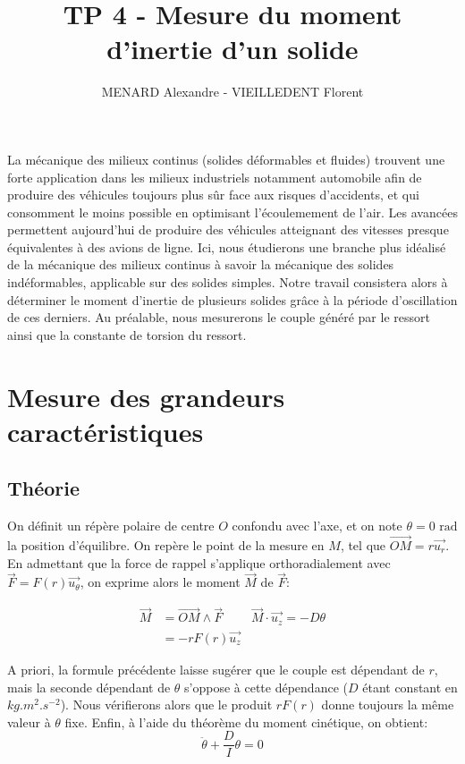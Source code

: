 \documentclass[12pt]{article}
\title{\vspace{-2cm}\textbf{TP 4 - Mesure du moment d'inertie d'un solide}}
\author{\vspace{-0.5cm}MENARD Alexandre - VIEILLEDENT Florent}
\date{\vspace{-0.7cm}}
\newcommand{\ut}{\vec{u_\theta}}
\newcommand{\ur}{\vec{u_r}}
\newcommand{\uz}{\vec{u_z}}
\begin{document}
\maketitle

La mécanique des milieux continus (solides déformables et fluides) trouvent une forte application dans les milieux industriels notamment automobile afin de produire
des véhicules toujours plus sûr face aux risques d'accidents, et qui consomment le moins possible en optimisant l'écoulemement de l'air. Les avancées permettent aujourd'hui
de produire des véhicules atteignant des vitesses presque équivalentes à des avions de ligne. Ici, nous étudierons une branche plus idéalisé de la mécanique des milieux continus à savoir la mécanique des solides
indéformables, applicable sur des solides simples. Notre travail consistera alors à déterminer le moment d'inertie de plusieurs solides grâce à la période d'oscillation de ces derniers. Au préalable,
nous mesurerons le couple généré par le ressort ainsi que la constante de torsion du ressort.


\section{Mesure des grandeurs caractéristiques}
\subsection{Théorie}
On définit un répère polaire de centre $O$ confondu avec l'axe, et on note $\theta=0 \text{ rad}$ la position d'équilibre. On repère le point
de la mesure en $M$, tel que $\vec{OM} = r\ur$. En admettant que la force de rappel
s'applique orthoradialement avec $\vec{F} = F(r) \ut$, on exprime alors le moment $\vec{M}$ de $\vec{F}$:

\begin{align*}
    \vec{M} & = \vec{OM} \wedge \vec{F} & \vec{M} \cdot \uz = -D\theta \\
            & = -rF(r) \uz
\end{align*}

A priori, la formule précédente laisse sugérer que le couple est dépendant de $r$, mais la seconde dépendant de $\theta$
s'oppose à cette dépendance ($D$ étant constant en $kg.m^2.s^{-2}$). Nous vérifierons alors que le produit $rF(r)$ donne toujours la même valeur à $\theta$ fixe.
Enfin, à l'aide du théorème du moment cinétique, on obtient:
\begin{equation}
    \ddot \theta + \frac{D}{I}\theta = 0
\end{equation}
\end{document}
